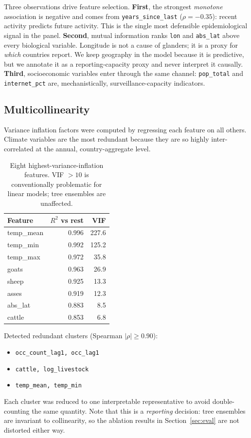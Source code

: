 \documentclass[11pt]{article}
\begin{document}
\noindent
Three observations drive feature selection.
\textbf{First}, the strongest \emph{monotone} association is negative and comes from
\texttt{years\_since\_last} ($\rho = -0.35$):
recent activity predicts future activity. This is the single most defensible epidemiological
signal in the panel.
\textbf{Second}, mutual information ranks \texttt{lon} and \texttt{abs\_lat} above every
biological variable. Longitude is not a cause of glanders; it is a proxy for \emph{which}
countries report. We keep geography in the model because it is predictive, but we annotate it as a
reporting-capacity proxy and never interpret it causally.
\textbf{Third}, socioeconomic variables enter through the same channel: \texttt{pop\_total}
and \texttt{internet\_pct} are, mechanistically, surveillance-capacity indicators.

\subsection{Multicollinearity}

Variance inflation factors were computed by regressing each feature on all others. Climate
variables are the most redundant because they are so highly inter-correlated at the annual,
country-aggregate level.

\begin{table}[H]
\centering
\caption{Eight highest-variance-inflation features. VIF $>10$ is conventionally problematic for
linear models; tree ensembles are unaffected.}
\label{tab:vif}
\small
\begin{tabular}{@{}lrr@{}}
\toprule
\textbf{Feature} & \textbf{$R^2$ vs rest} & \textbf{VIF} \\
\midrule
temp\_mean & 0.996 & 227.6 \\
temp\_min & 0.992 & 125.2 \\
temp\_max & 0.972 & 35.8 \\
goats & 0.963 & 26.9 \\
sheep & 0.925 & 13.3 \\
asses & 0.919 & 12.3 \\
abs\_lat & 0.883 & 8.5 \\
cattle & 0.853 & 6.8 \\
\bottomrule
\end{tabular}
\end{table}

\noindent
Detected redundant clusters (Spearman $|\rho| \geq 0.90$):
\begin{itemize}
\itemsep0.1em
  \item \texttt{{occ\_count\_lag1, occ\_lag1}}
  \item \texttt{{cattle, log\_livestock}}
  \item \texttt{{temp\_mean, temp\_min}}

\end{itemize}
Each cluster was reduced to one interpretable representative to avoid double-counting the same
quantity. Note that this is a \emph{reporting} decision: tree ensembles are invariant to
collinearity, so the ablation results in Section~\ref{sec:eval} are not distorted either way.
\end{document}
